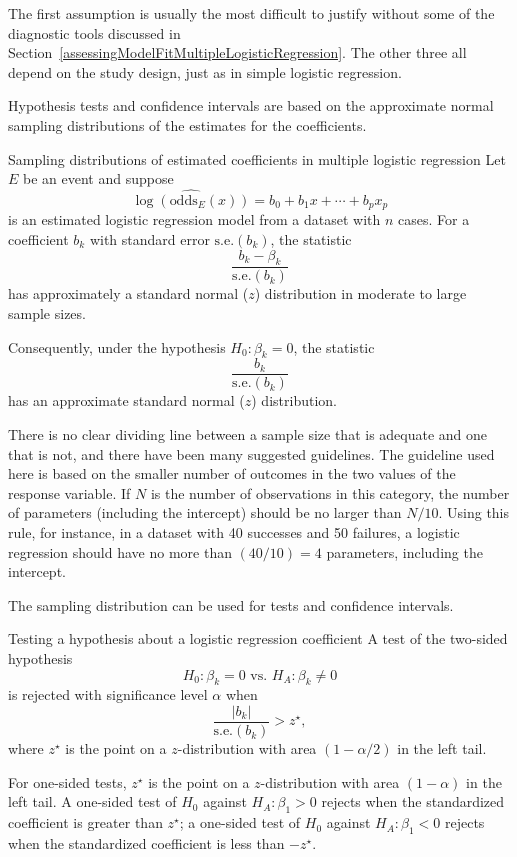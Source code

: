 The first assumption is usually the most difficult to justify without some of the diagnostic tools discussed in Section~\ref{assessingModelFitMultipleLogisticRegression}.  The other three all depend on the study design, just as in simple logistic regression.

Hypothesis tests and confidence intervals are based on the approximate normal sampling distributions of the estimates for the coefficients.

\begin{onebox}{Sampling distributions of estimated coefficients in multiple logistic regression}
Let $E$ be an event and suppose
\[
  \widehat{\log(\textrm{odds}_{E}(x))} = b_0 + b_1 x + \cdots + b_p x_p
\]
is an estimated logistic regression model from a dataset with $n$ cases.  For a coefficient $b_k$ with standard error $\text{s.e.}(b_k)$, the statistic
\[
      \frac{b_k - \beta_k}{\textrm{s.e.}(b_k)}
\]
has approximately a standard normal ($z$) distribution in moderate to large sample sizes.

Consequently, under the hypothesis $H_0: \beta_k = 0$, the statistic
\[
      \frac{b_k}{\textrm{s.e.}(b_k)}
\]
has an approximate standard normal ($z$) distribution.
\end{onebox}

There is no clear dividing line between a sample size that is adequate and one that is not, and there have been many suggested guidelines.  The guideline used here is based on the  smaller number of outcomes in the two values of the response variable.  If $N$ is the number of observations in this category, the number of parameters (including the intercept) should be no larger than $N/10$.    Using this rule, for instance, in a dataset with 40 successes and 50 failures, a logistic regression should have no more than $(40/10) = 4$ parameters, including the intercept.

The sampling distribution can be used for tests and confidence intervals.

\begin{onebox}{Testing a hypothesis about a logistic regression coefficient}
A test of the two-sided hypothesis
\[
  H_0: \beta_k = 0 \text{ vs. } H_A: \beta_k \ne 0
\]
is rejected with significance level $\alpha$ when
\[
     \frac{|b_k|}{\textrm{s.e.}(b_k)} > z^\star,
\]
where $z^\star$ is the point on a $z$-distribution with area $(1 - \alpha/2)$ in the left tail.
\end{onebox}

For one-sided tests, $z^\star$ is the point on a $z$-distribution with area $(1 - \alpha)$ in the left tail. A one-sided test of $H_0$ against $H_A: \beta_1 > 0$ rejects when the standardized coefficient is greater than  $ z^\star$; a one-sided test of $H_0$ against $H_A: \beta_1 < 0$  rejects when the standardized coefficient is less than $-z^\star$.

